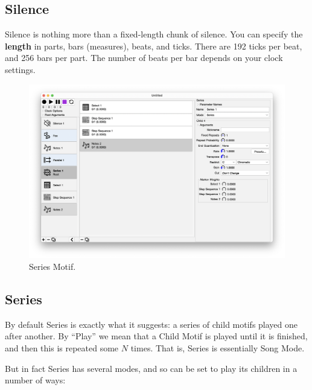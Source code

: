 \documentclass[twoside,10pt]{article}
\begin{document}
\subsection{Silence}

Silence is nothing more than a fixed-length chunk of silence.    You can specify the {\bf length} in parts, bars (measures), beats, and ticks.  There are 192 ticks per beat, and 256 bars per part.  The number of beats per bar depends on your clock settings.

\clearpage

\begin{figure}[t]
\centering
\includegraphics[width=6.5in]{Series}
\vspace{-2em}
\caption{Series Motif.}
\label{series}
\end{figure}

\subsection{Series}

By default Series is exactly what it suggests: a series of child motifs played one after another.   By ``Play'' we mean that a Child Motif is played until it is finished, and then this is repeated some \(N\) times.  That is, Series is essentially Song Mode.  

But in fact Series has several modes, and so can be set to play its children in a number of ways:
\end{document}
